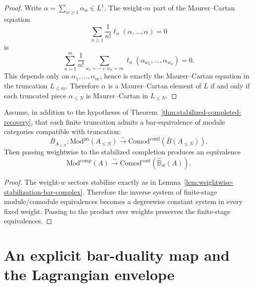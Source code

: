 \begin{proof}
Write $\alpha=\sum_{w\ge 1}\alpha_w\in L^1$.  The weight-$m$ part of the
Maurer--Cartan equation
\[
\sum_{n\ge 1}\frac{1}{n!}\ell_n(\alpha,\dots,\alpha)=0
\]
is
\[
\sum_{n=1}^{m}\frac{1}{n!}
\sum_{w_1+\cdots+w_n=m}
\ell_n(\alpha_{w_1},\dots,\alpha_{w_n})=0.
\]
This depends only on $\alpha_1,\dots,\alpha_m$, hence is exactly the
Maurer--Cartan equation in the truncation $L_{\le m}$.  Therefore $\alpha$ is a
Maurer--Cartan element of $L$ if and only if each truncated piece
$\alpha_{\le N}$ is Maurer--Cartan in $L_{\le N}$.
\end{proof}

\begin{proposition}
\label{prop:module-comodule-stabilized}
Assume, in addition to the hypotheses of
Theorem~\ref{thm:stabilized-completed-recovery}, that each finite truncation
admits a bar-equivalence of module categories compatible with truncation:
\[
\overline{B}_{A_{\le N}}\colon \mathrm{Mod}^{\mathrm{pn}}(A_{\le N})
\xrightarrow{\sim}
\mathrm{Comod}^{\mathrm{conil}}(\overline{B}(A_{\le N})).
\]
Then passing weightwise to the stabilized completion produces an equivalence
\[
\mathrm{Mod}^{\mathrm{comp}}(A)
\xrightarrow{\sim}
\mathrm{Comod}^{\mathrm{cont}}(\widehat{\mathbb{B}}_{\mathrm{st}}(A)).
\]
\end{proposition}

\begin{proof}
The weight-$w$ sectors stabilize exactly as in
Lemma~\ref{lem:weightwise-stabilization-bar-complex}.  Therefore the inverse
system of finite-stage module/comodule equivalences becomes a degreewise
constant system in every fixed weight.  Passing to the product over weights
preserves the finite-stage equivalences.
\end{proof}

\section{An explicit bar-duality map and the Lagrangian envelope}
\label{sec:explicit-bar-duality-lagrangian-envelope}

